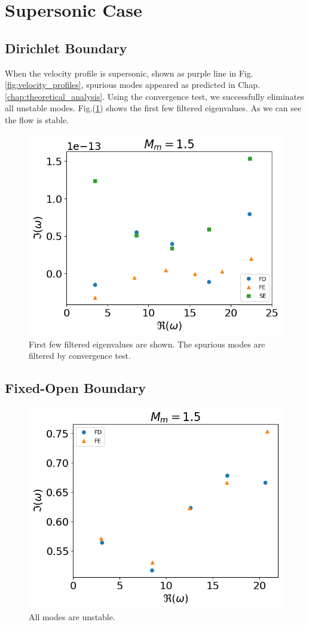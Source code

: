 \section{Supersonic Case}
\subsection{Dirichlet Boundary}
When the velocity profile is supersonic, shown as purple line in Fig.\ref{fig:velocity_profiles}, spurious modes appeared as predicted in Chap.\ref{chap:theoretical_analysis}. Using the convergence test, we successfully eliminates all unstable modes. Fig.(\ref{fig:supersonic_v_dirichlet}) shows the first few filtered eigenvalues. As we can see the flow is stable.
\begin{figure} [H]
	\centering
	\includegraphics[width=0.7\linewidth]{img/numerical_experiments/fixed_fixed/supersonic_v}
	\caption{First few filtered eigenvalues are shown. The spurious modes are filtered by convergence test.}
	\label{fig:supersonic_v_dirichlet}
\end{figure}

\subsection{Fixed-Open Boundary}
\begin{figure} [H]
	\centering
	\includegraphics[width=0.7\linewidth]{img/numerical_experiments/fixed_open/supersonic_v}
	\caption{All modes are unstable.}
	\label{fig:supersonic_v_fixed_open}
\end{figure}


